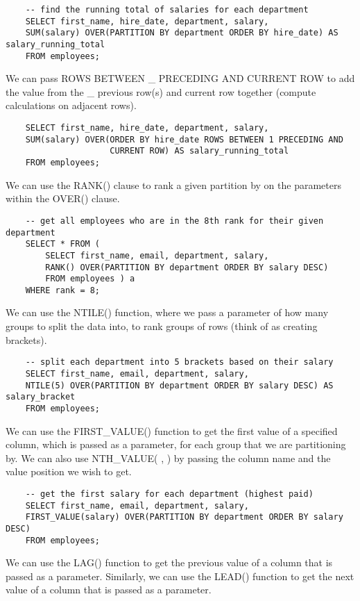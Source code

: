 \documentclass[11pt, a4paper]{article}
\begin{document}
\begin{spacing}{1.1}
\begin{lstlisting}
	-- find the running total of salaries for each department
	SELECT first_name, hire_date, department, salary,
	SUM(salary) OVER(PARTITION BY department ORDER BY hire_date) AS salary_running_total
	FROM employees;	\end{lstlisting} \vspace*{1mm}
	We can pass ROWS BETWEEN \_ PRECEDING AND CURRENT ROW to add the value from the \_ previous row(s) and current row together (compute calculations on adjacent rows). 
	\begin{lstlisting}
	SELECT first_name, hire_date, department, salary,
	SUM(salary) OVER(ORDER BY hire_date ROWS BETWEEN 1 PRECEDING AND 
	                 CURRENT ROW) AS salary_running_total
	FROM employees; \end{lstlisting} \vspace*{1mm}
	We can use the RANK() clause to rank a given partition by on the parameters within the OVER() clause.
	\begin{lstlisting}
	-- get all employees who are in the 8th rank for their given department
	SELECT * FROM (
		SELECT first_name, email, department, salary, 
		RANK() OVER(PARTITION BY department ORDER BY salary DESC)
		FROM employees ) a
	WHERE rank = 8; \end{lstlisting} \vspace*{1mm}
	We can use the NTILE() function, where we pass a parameter of how many groups to split the data into, to rank groups of rows (think of as creating brackets). 
	\begin{lstlisting}
	-- split each department into 5 brackets based on their salary
	SELECT first_name, email, department, salary, 
	NTILE(5) OVER(PARTITION BY department ORDER BY salary DESC) AS salary_bracket
	FROM employees;	\end{lstlisting} \vspace*{1mm}
	We can use the FIRST\_VALUE() function to get the first value of a specified column, which is passed as a parameter, for each group that we are partitioning by. We can also use NTH\_VALUE( , ) by passing the column name and the value position we wish to get.
	\begin{lstlisting}
	-- get the first salary for each department (highest paid)
	SELECT first_name, email, department, salary, 
	FIRST_VALUE(salary) OVER(PARTITION BY department ORDER BY salary DESC)
	FROM employees;	\end{lstlisting} \vspace*{1mm}
	We can use the LAG() function to get the previous value of a column that is passed as a parameter. Similarly, we can use the LEAD() function to get the next value of a column that is passed as a parameter.

\end{spacing}
\end{document}
